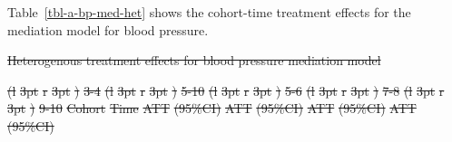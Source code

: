 \documentclass[
  letterpaper,
  DIV=11,
  numbers=noendperiod]{scrartcl}
\makeatletter
\renewenvironment{table}%
   {\renewcommand\familydefault\sfdefault
    \@float{table}}
   {\end@float}
\providecommand{\DIFdel}[1]{{\protect\color{red}\sout{#1}}}                      %
\providecommand{\DIFdelbegin}{} %
\providecommand{\DIFdelFL}[1]{\DIFdel{#1}} %
\newcommand{\DIFscaledelfig}{0.5}
\newlength{\DIFdelgraphicswidth} %
\newlength{\DIFdelgraphicsheight} %
\newcommand{\DIFdelincludegraphics}[2][]{%
\sbox{\DIFdelgraphicsbox}{\DIFOincludegraphics[#1]{#2}}%
\settoboxwidth{\DIFdelgraphicswidth}{\DIFdelgraphicsbox} %
\settoboxtotalheight{\DIFdelgraphicsheight}{\DIFdelgraphicsbox} %
\scalebox{\DIFscaledelfig}{%
\parbox[b]{\DIFdelgraphicswidth}{\usebox{\DIFdelgraphicsbox}\\[-\baselineskip] \rule{\DIFdelgraphicswidth}{0em}}\llap{\resizebox{\DIFdelgraphicswidth}{\DIFdelgraphicsheight}{%
\setlength{\unitlength}{\DIFdelgraphicswidth}%
\begin{picture}(1,1)%
\thicklines\linethickness{2pt} %
{\color[rgb]{1,0,0}\put(0,0){\framebox(1,1){}}}%
{\color[rgb]{1,0,0}\put(0,0){\line( 1,1){1}}}%
{\color[rgb]{1,0,0}\put(0,1){\line(1,-1){1}}}%
\end{picture}%
}\hspace*{3pt}}} %
} %
\DeclareRobustCommand{\DIFdelbegin}{\DIFOdelbegin \let\includegraphics\DIFdelincludegraphics} %
\makeatother
\begin{document}
Table~\ref{tbl-a-bp-med-het} shows the cohort-time treatment effects for
the mediation model for blood pressure.

\DIFdelbegin %
{%
\DIFdelFL{Heterogenous treatment effects for blood pressure mediation model }}%


\DIFdelFL{(l}%
\DIFdelFL{3pt}%
\DIFdelFL{r}%
\DIFdelFL{3pt}%
\DIFdelFL{)}%
\DIFdelFL{3-4}%
\DIFdelFL{(l}%
\DIFdelFL{3pt}%
\DIFdelFL{r}%
\DIFdelFL{3pt}%
\DIFdelFL{)}%
\DIFdelFL{5-10}%
\DIFdelFL{(l}%
\DIFdelFL{3pt}%
\DIFdelFL{r}%
\DIFdelFL{3pt}%
\DIFdelFL{)}%
\DIFdelFL{5-6}%
\DIFdelFL{(l}%
\DIFdelFL{3pt}%
\DIFdelFL{r}%
\DIFdelFL{3pt}%
\DIFdelFL{)}%
\DIFdelFL{7-8}%
\DIFdelFL{(l}%
\DIFdelFL{3pt}%
\DIFdelFL{r}%
\DIFdelFL{3pt}%
\DIFdelFL{)}%
\DIFdelFL{9-10}%
\DIFdelFL{Cohort }%
\DIFdelFL{Time }%
\DIFdelFL{ATT }%
\DIFdelFL{(95\%CI) }%
\DIFdelFL{ATT }%
\DIFdelFL{(95\%CI) }%
\DIFdelFL{ATT }%
\DIFdelFL{(95\%CI) }%
\DIFdelFL{ATT }%
\DIFdelFL{(95\%CI)}%
\end{document}

